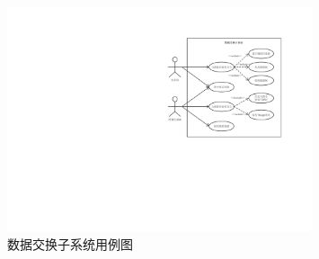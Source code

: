 \begin{figure}[h!]
    \begin{center}
        \includegraphics[width=0.8\textwidth]{pictures/usecase.pdf}
        \caption{数据交换子系统用例图}
        \label{usecase}
    \end{center}
\end{figure}

